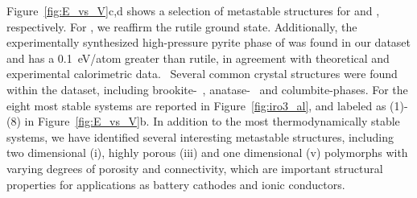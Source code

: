 %
Figure~\ref{fig:E_vs_V}c,d shows a selection of metastable structures for \IrOtwo and \IrOthree, respectively.
%
For \IrOtwo, we reaffirm the rutile ground state.
%
Additionally, the experimentally synthesized high-pressure pyrite phase of \IrOtwo was found in our dataset and has a \DHf \mytilde\SI{0.1}{\electronvolt}/atom greater than rutile,
in agreement with theoretical and experimental calorimetric data.~\cite{bolzan1997structural, shirako2014synthesis}
%
%
Several common \ABtwo crystal structures were found within the dataset,
including brookite-~\cite{brookite}, anatase-~\cite{anatase} and columbite-\IrOtwo phases.
%
For \IrOthree the eight most stable systems are reported in Figure~\ref{fig:iro3_al}, and labeled as (1)-(8) in Figure~\ref{fig:E_vs_V}b.
%
In addition to the most thermodynamically stable systems,
we have identified several interesting metastable structures,
including two dimensional (i), highly porous (iii) and one dimensional (v) polymorphs with varying degrees of porosity and connectivity,
which are important structural properties for applications as battery cathodes and ionic conductors.~\cite{Pearce2017,Pearce2019}
%
